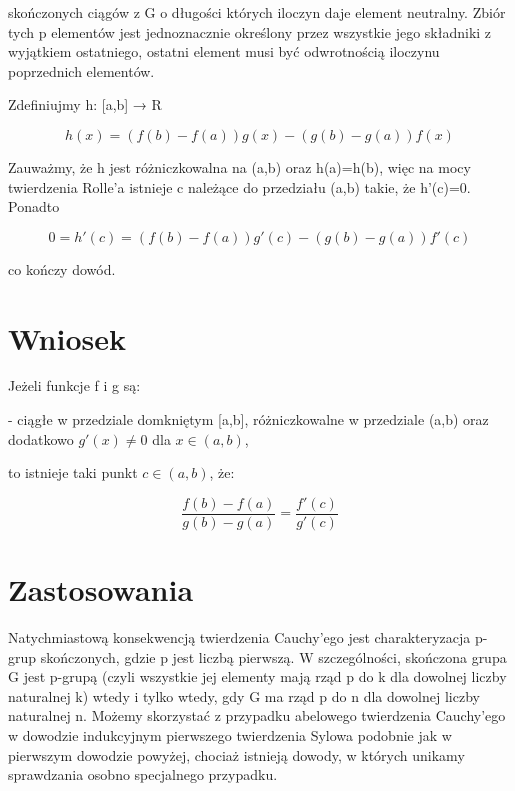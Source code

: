 \documentclass{article}
\begin{document}
skończonych ciągów z G o długości których iloczyn daje element neutralny. Zbiór tych p elementów jest jednoznacznie określony przez wszystkie jego składniki z wyjątkiem ostatniego, ostatni element musi być odwrotnością iloczynu poprzednich elementów.

Zdefiniujmy h: [a,b] → R

\begin{equation*}
	h(x)=(f(b)-f(a))g(x)-(g(b)-g(a))f(x)
\end{equation*}

Zauważmy, że h jest różniczkowalna na (a,b) oraz h(a)=h(b), więc na mocy twierdzenia Rolle’a istnieje c należące do przedziału (a,b) takie, że h'(c)=0. Ponadto 

\begin{equation}
	0=h'(c)=(f(b)-f(a))g'(c)-(g(b)-g(a))f'(c)
\end{equation}

co kończy dowód.

\section*{Wniosek}
Jeżeli funkcje f i g są:

- ciągłe w przedziale domkniętym [a,b], różniczkowalne w przedziale (a,b) oraz dodatkowo $g'(x)\not =0$ dla \(x\in (a,b)\),

to istnieje taki punkt $c\in (a,b)$, że: 

\begin{displaymath}
	{\frac {f(b)-f(a)}{g(b)-g(a)}}={\frac {f'(c)}{g'(c)}} 
\end{displaymath}

\section*{Zastosowania}
Natychmiastową konsekwencją twierdzenia Cauchy’ego jest charakteryzacja p-grup skończonych, gdzie p jest liczbą pierwszą. W szczególności, skończona grupa G jest p-grupą (czyli wszystkie jej elementy mają rząd p do k dla dowolnej liczby naturalnej k) wtedy i tylko wtedy, gdy G ma rząd p do n dla dowolnej liczby naturalnej n. Możemy skorzystać z przypadku abelowego twierdzenia Cauchy’ego w dowodzie indukcyjnym pierwszego twierdzenia Sylowa podobnie jak w pierwszym dowodzie powyżej, chociaż istnieją dowody, w których unikamy sprawdzania osobno specjalnego przypadku.
\end{document}

